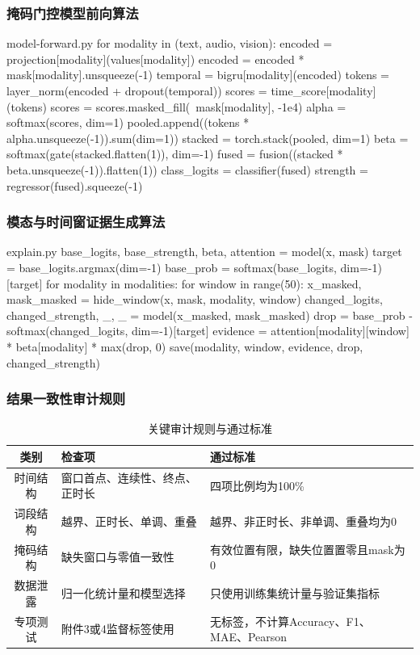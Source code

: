 \documentclass{gmcmthesis}
\begin{document}
\begin{appendices}
\subsubsection{掩码门控模型前向算法}
\begin{Python}{model-forward.py}
for modality in (text, audio, vision):
    encoded = projection[modality](values[modality])
    encoded = encoded * mask[modality].unsqueeze(-1)
    temporal = bigru[modality](encoded)
    tokens = layer_norm(encoded + dropout(temporal))
    scores = time_score[modality](tokens)
    scores = scores.masked_fill(~mask[modality], -1e4)
    alpha = softmax(scores, dim=1)
    pooled.append((tokens * alpha.unsqueeze(-1)).sum(dim=1))
stacked = torch.stack(pooled, dim=1)
beta = softmax(gate(stacked.flatten(1)), dim=-1)
fused = fusion((stacked * beta.unsqueeze(-1)).flatten(1))
class_logits = classifier(fused)
strength = regressor(fused).squeeze(-1)
\end{Python}
\subsubsection{模态与时间窗证据生成算法}
\begin{Python}{explain.py}
base_logits, base_strength, beta, attention = model(x, mask)
target = base_logits.argmax(dim=-1)
base_prob = softmax(base_logits, dim=-1)[target]
for modality in modalities:
    for window in range(50):
        x_masked, mask_masked = hide_window(x, mask, modality, window)
        changed_logits, changed_strength, _, _ = model(x_masked, mask_masked)
        drop = base_prob - softmax(changed_logits, dim=-1)[target]
        evidence = attention[modality][window] * beta[modality] * max(drop, 0)
        save(modality, window, evidence, drop, changed_strength)
\end{Python}
\subsubsection{结果一致性审计规则}

\begin{table}[H]
\centering
\caption{关键审计规则与通过标准}
\begin{tabularx}{0.96\textwidth}{cY Y}
\toprule
类别 & 检查项 & 通过标准 \\
\midrule
时间结构 & 窗口首点、连续性、终点、正时长 & 四项比例均为100\% \\
词段结构 & 越界、正时长、单调、重叠 & 越界、非正时长、非单调、重叠均为0 \\
掩码结构 & 缺失窗口与零值一致性 & 有效位置有限，缺失位置置零且mask为0 \\
数据泄露 & 归一化统计量和模型选择 & 只使用训练集统计量与验证集指标 \\
专项测试 & 附件3或4监督标签使用 & 无标签，不计算Accuracy、F1、MAE、Pearson \\
\bottomrule
\end{tabularx}
\end{table}


\end{appendices}
\end{document}

